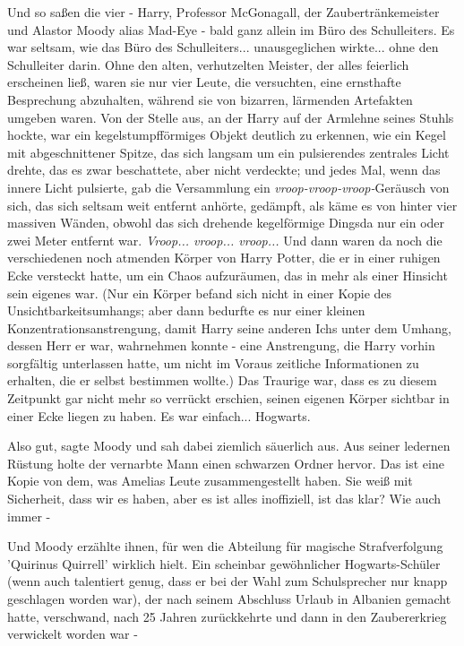 Und so saßen die vier - Harry, Professor McGonagall, der Zaubertränkemeister und
Alastor Moody alias \glqq Mad-Eye\grqq{} - bald ganz allein im Büro des
Schulleiters. Es war seltsam, wie das Büro des Schulleiters... unausgeglichen
wirkte... ohne den Schulleiter darin. Ohne den alten, verhutzelten Meister, der
alles feierlich erscheinen ließ, waren sie nur vier Leute, die versuchten, eine
ernsthafte Besprechung abzuhalten, während sie von bizarren, lärmenden
Artefakten umgeben waren. Von der Stelle aus, an der Harry auf der Armlehne
seines Stuhls hockte, war ein kegelstumpfförmiges Objekt deutlich zu erkennen,
wie ein Kegel mit abgeschnittener Spitze, das sich langsam um ein pulsierendes
zentrales Licht drehte, das es zwar beschattete, aber nicht verdeckte; und jedes
Mal, wenn das innere Licht pulsierte, gab die Versammlung ein
\emph{vroop-vroop-vroop-}Geräusch von sich, das sich seltsam weit entfernt
anhörte, gedämpft, als käme es von hinter vier massiven Wänden, obwohl das sich
drehende kegelförmige Dingsda nur ein oder zwei Meter entfernt war.
\emph{Vroop... vroop... vroop... } Und dann waren da noch die verschiedenen noch
atmenden Körper von Harry Potter, die er in einer ruhigen Ecke versteckt hatte,
um ein Chaos aufzuräumen, das in mehr als einer Hinsicht sein eigenes war. (Nur
ein Körper befand sich nicht in einer Kopie des Unsichtbarkeitsumhangs; aber
dann bedurfte es nur einer kleinen Konzentrationsanstrengung, damit Harry seine
anderen Ichs unter dem Umhang, dessen Herr er war, wahrnehmen konnte - eine
Anstrengung, die Harry vorhin sorgfältig unterlassen hatte, um nicht im Voraus
zeitliche Informationen zu erhalten, die er selbst bestimmen wollte.) Das
Traurige war, dass es zu diesem Zeitpunkt gar nicht mehr so verrückt erschien,
seinen eigenen Körper sichtbar in einer Ecke liegen zu haben. Es war einfach...
Hogwarts.

\glqq Also gut\grqq{}, sagte Moody und sah dabei ziemlich säuerlich aus. Aus
seiner ledernen Rüstung holte der vernarbte Mann einen schwarzen Ordner hervor.
\glqq Das ist eine Kopie von dem, was Amelias Leute zusammengestellt haben. Sie
weiß mit Sicherheit, dass wir es haben, aber es ist alles inoffiziell, ist das
klar? Wie auch immer -\grqq{}

Und Moody erzählte ihnen, für wen die Abteilung für magische Strafverfolgung
'Quirinus Quirrell' wirklich hielt. Ein scheinbar gewöhnlicher Hogwarts-Schüler
(wenn auch talentiert genug, dass er bei der Wahl zum Schulsprecher nur knapp
geschlagen worden war), der nach seinem Abschluss Urlaub in Albanien gemacht
hatte, verschwand, nach 25 Jahren zurückkehrte und dann in den Zaubererkrieg
verwickelt worden war -

